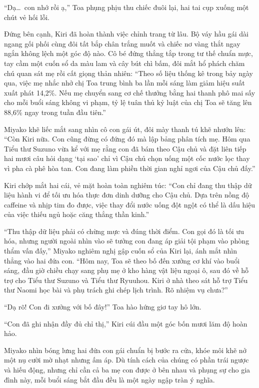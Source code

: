 \documentclass[../main.tex]{subfiles}
\begin{document}
``Dạ\dots\ con nhớ rồi ạ,'' Toa phụng phịu thu chiếc đuôi lại, hai tai cụp xuống một chút vẻ hối lỗi.

Đứng bên cạnh, Kiri đã hoàn thành việc chỉnh trang từ lâu. Bộ váy hầu gái dài ngang gối phối cùng đôi tất bắp chân trắng muốt và chiếc nơ vàng thắt ngay ngắn không lệch một góc độ nào. Cô bé đứng thẳng tắp trong tư thế chuẩn mực, tay cầm một cuốn sổ da màu lam và cây bút chì bấm, đôi mắt hổ phách chăm chú quan sát mẹ rồi cất giọng thản nhiên: ``Theo số liệu thống kê trong bảy ngày qua, việc mẹ nhắc nhở chị Toa trung bình ba lần mỗi sáng làm giảm hiệu suất xuất phát 14,2\%. Nếu mẹ chuyển sang cơ chế thưởng bằng hai thanh phô mai sấy cho mỗi buổi sáng không vi phạm, tỷ lệ tuân thủ kỷ luật của chị Toa sẽ tăng lên 88,6\% ngay trong tuần đầu tiên.''

Miyako khẽ liếc mắt sang nhìn cô con gái út, đôi mày thanh tú khẽ nhướn lên: ``Còn Kiri nữa. Con cũng đừng có đứng đó mà lập bảng phân tích mẹ. Hôm qua Tiểu thư Suzuno vừa kể với mẹ rằng con đã bám theo Cậu chủ và đặt liên tiếp hai mươi câu hỏi dạng `tại sao' chỉ vì Cậu chủ chọn uống một cốc nước lọc thay vì pha cà phê hòa tan. Con đang làm phiền thời gian nghỉ ngơi của Cậu chủ đấy.''

Kiri chớp mắt hai cái, vẻ mặt hoàn toàn nghiêm túc: ``Con chỉ đang thu thập dữ liệu hành vi để tối ưu hóa thực đơn dinh dưỡng cho Cậu chủ. Dựa trên nồng độ caffeine và nhịp tim đo được, việc thay đổi nước uống đột ngột có thể là dấu hiệu của việc thiếu ngủ hoặc căng thẳng thần kinh.''

``Thu thập dữ liệu phải có chừng mực và đúng thời điểm. Con gọi đó là tối ưu hóa, nhưng người ngoài nhìn vào sẽ tưởng con đang áp giải tội phạm vào phòng thẩm vấn đấy,'' Miyako nghiêm nghị gập cuốn sổ của Kiri lại, ánh mắt nhìn thẳng vào hai đứa con. ``Hôm nay, Toa sẽ theo bố đến xưởng cơ khí vào buổi sáng, đầu giờ chiều chạy sang phụ mẹ ở kho hàng vật liệu ngoại ô, sau đó về hỗ trợ cho Tiểu thư Suzuno và Tiểu thư Ryuuhou. Kiri ở nhà theo sát hỗ trợ Tiểu thư Naomi học bài và phụ trách ghi chép lịch trình. Rõ nhiệm vụ chưa?''

``Dạ rõ! Con đi xưởng với bố đây!'' Toa hào hứng giơ tay hô lớn.

``Con đã ghi nhận đầy đủ chỉ thị,'' Kiri cúi đầu một góc bốn mươi lăm độ hoàn hảo.

Miyako nhìn bóng lưng hai đứa con gái chuẩn bị bước ra cửa, khóe môi khẽ nở một nụ cười mờ nhạt nhưng ấm áp. Dù tính cách của chúng có phần trái ngược và hiếu động, nhưng chỉ cần cả ba mẹ con được ở bên nhau và phụng sự cho gia đình này, mỗi buổi sáng bắt đầu đều là một ngày ngập tràn ý nghĩa.
\end{document}
